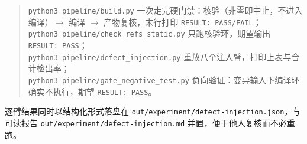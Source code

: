 \begin{quote}
\texttt{python3 pipeline/build.py} \quad 一次走完硬门禁：核验（非零即中止，不进入编译）$\rightarrow$ 编译 $\rightarrow$ 产物复核，末行打印 \texttt{RESULT: PASS/FAIL}；\\
\texttt{python3 pipeline/check\_refs\_static.py} \quad 只跑核验环，期望输出 \texttt{RESULT: PASS}；\\
\texttt{python3 pipeline/defect\_injection.py} \quad 重放八个注入臂，打印上表与合计检出率；\\
\texttt{python3 pipeline/gate\_negative\_test.py} \quad 负向验证：变异输入下编译环确实不执行，期望 \texttt{RESULT: PASS}。
\end{quote}

逐臂结果同时以结构化形式落盘在 \texttt{out/experiment/defect-injection.json}，与可读报告 \texttt{out/experiment/defect-injection.md} 并置，便于他人复核而不必重跑。
